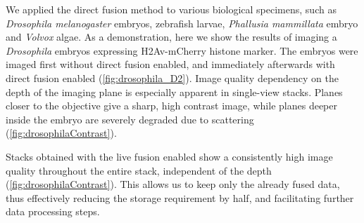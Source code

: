   We applied the direct fusion method to various biological specimens, such as \textit{Drosophila melanogaster} embryos, zebrafish larvae, \textit{Phallusia mammillata} embryo and \textit{Volvox} algae. As a demonstration, here we show the results of imaging a \textit{Drosophila} embryos expressing H2Av-mCherry histone marker. The embryos were imaged first without direct fusion enabled, and immediately afterwards with direct fusion enabled (\autoref{fig:drosophila_D2}). Image quality dependency on the depth of the imaging plane is especially apparent in single-view stacks. Planes closer to the objective give a sharp, high contrast image, while planes deeper inside the embryo are severely degraded due to scattering (\autoref{fig:drosophilaContrast}).

  Stacks obtained with the live fusion enabled show a consistently high image quality throughout the entire stack, independent of the depth (\autoref{fig:drosophilaContrast}). This allows us to keep only the already fused data, thus effectively reducing the storage requirement by half, and facilitating further data processing steps.


 

  










